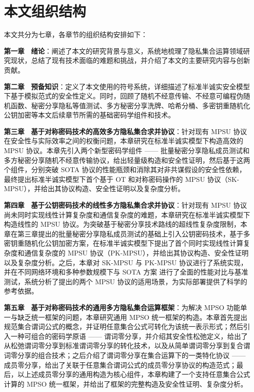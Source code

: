 \section{本文组织结构}

本文共分为七章，各章节的组织结构安排如下：

\textbf{第一章 \ 绪论}：阐述了本文的研究背景与意义，系统地梳理了隐私集合运算领域研究现状，总结了现有技术面临的难题和挑战，并介绍了本文的主要研究内容与创新贡献。

\textbf{第二章 \ 预备知识}：定义了本文使用的符号系统，详细描述了标准半诚实安全模型下基于模拟范式的安全性定义。同时，回顾了随机不经意传输、不经意可编程伪随机函数、秘密分享隐私等值测试、多方秘密分享洗牌、哈希分桶、多密钥重随机化公钥加密等本文后续章节所需的基础密码学组件和技术。

\textbf{第三章 \ 基于对称密码技术的高效多方隐私集合求并协议}：针对现有 MPSU 协议在安全性与实际效率之间的权衡问题，本章研究在标准半诚实模型下构造高效的 MPSU 协议。本章先引入两个新型密码学组件 —— 批量秘密分享隐私成员测试和多方秘密分享随机不经意传输协议，给出轻量级构造和安全性证明，然后基于这两个组件，分别突破 SOTA 协议的性能瓶颈和消除其对非共谋假设的安全性依赖，最终提出标准半诚实模型下首个基于 OT 和对称密码操作的 MPSU 协议（SK-MPSU），并给出其协议构造、安全性证明以及复杂度分析。

\textbf{第四章 \ 基于公钥密码技术的线性多方隐私集合求并协议}：针对现有 MPSU 协议尚未同时实现线性计算复杂度和通信复杂度的难题，本章研究在标准半诚实模型下构造线性的 MPSU 协议。为突破基于秘密分享技术路线的超线性复杂度限制，本章在第三章提出的批量秘密分享隐私成员测试的基础上引入公钥密码技术，基于多密钥重随机化公钥加密方案，在标准半诚实模型下提出了首个同时实现线性计算复杂度和通信复杂度的 MPSU 协议（PK-MPSU），并给出其协议构造、安全性证明以及复杂度分析。之后，本章对 SK-MPSU 与 PK-MPSU 协议进行了系统实现，并在不同网络环境和多种参数规模下与 SOTA 方案 \cite{LG-ASIACRYPT-2023} 进行了全面的性能对比与基准测试，系统分析了提出的两个 MPSU 协议的适用场景，为实际部署提供了科学的参考依据。

\textbf{第五章 \ 基于对称密码技术的通用多方隐私集合运算框架}：为解决 MPSO 功能单一与缺乏统一框架的问题，本章研究通用 MPSO 统一框架的构造。本章首先提出规范集合谓词公式的概念，并证明任意集合公式可转化为该统一表示形式；然后引入一种可组合的密码学原语 —— 谓词零分享，并介绍其安全性松弛定义，给出了从松弛谓词零分享到标准谓词零分享的转化技术，以及从简单谓词零分享到复合谓词零分享的组合技术；之后介绍了谓词零分享在集合运算下的一类特化协议 —— 成员零分享，给出了关联于任意集合谓词公式的成员零分享协议的构造范式；最后，以上述成员零分享的通用构造为核心组件，本章构建了一个支持任意集合公式计算的 MPSO 统一框架，并给出了框架的完整构造及安全性证明、复杂度分析。

